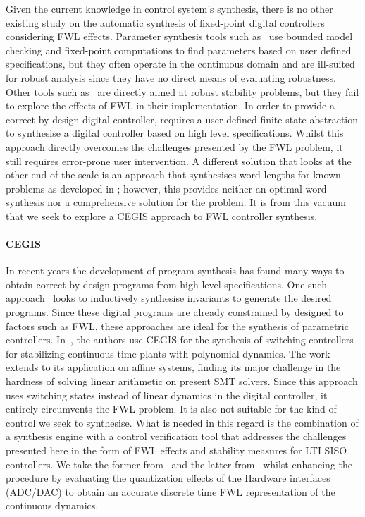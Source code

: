 \documentclass{sig-alternate-05-2015}
\begin{document}
Given the current knowledge in control system's synthesis, there is no other
existing study on the automatic synthesis of fixed-point digital controllers
considering FWL effects.  Parameter synthesis tools such
as~\cite{cimatti2013parameter} use bounded model checking and fixed-point
computations to find parameters based on user defined specifications, but
they often operate in the continuous domain and are ill-suited for robust
analysis since they have no direct means of evaluating robustness.  Other
tools such as~\cite{economakos2016automated} are directly aimed at robust
stability problems, but they fail to explore the effects of FWL in their
implementation.  In order to provide a correct by design digital controller,
\cite{alur2016compositional} requires a user-defined finite state
abstraction to synthesise a digital controller based on high level
specifications.  Whilst this approach directly overcomes the challenges
presented by the FWL problem, it still requires error-prone user
intervention.  A different solution that looks at the other end of the scale
is an approach that synthesises word lengths for known problems as developed
in \cite{jha2013swati}; however, this provides neither an optimal word
synthesis nor a comprehensive solution for the problem.  It is from this
vacuum that we seek to explore a CEGIS approach to FWL controller synthesis.

\paragraph{CEGIS}

In recent years the development of program synthesis has found many ways to
obtain correct by design programs from high-level specifications.  One such
approach~\cite{itzhaky2010simple} looks to inductively synthesise invariants
to generate the desired programs.  Since these digital programs are already
constrained by designed to factors such as FWL, these approaches are ideal
for the synthesis of parametric controllers. 
In~\cite{DBLP:conf/cdc/RavanbakhshS15}, the authors use CEGIS for the
synthesis of switching controllers for stabilizing continuous-time plants
with polynomial dynamics.  The work extends to its application on affine
systems, finding its major challenge in the hardness of solving linear
arithmetic on present SMT solvers.  Since this approach uses switching
states instead of linear dynamics in the digital controller, it entirely
circumvents the FWL problem.  It is also not suitable for the kind of
control we seek to synthesise.  What is needed in this regard is the
combination of a synthesis engine with a control verification tool that
addresses the challenges presented here in the form of FWL effects and
stability measures for LTI SISO controllers.  We take the former
from~\cite{DBLP:conf/lpar/DavidKL15} and the latter from~\cite{daes20161}
whilst enhancing the procedure by evaluating the quantization effects of
the Hardware interfaces (ADC/DAC) to obtain an accurate discrete time FWL
representation of the continuous dynamics.
 
\end{document}
